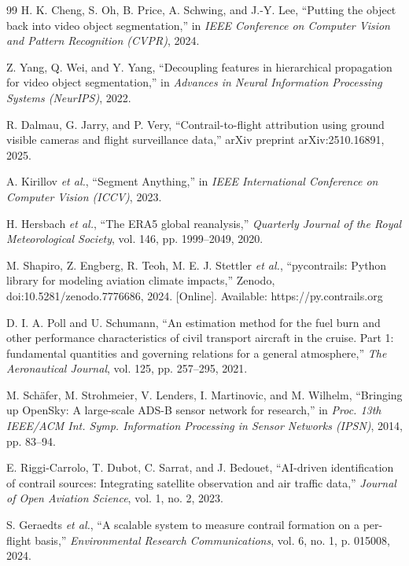 \documentclass[1p,11pt]{elsarticle}
\begin{document}
\begin{thebibliography}{99}
H. K. Cheng, S. Oh, B. Price, A. Schwing, and J.-Y. Lee, ``Putting the object back into video object segmentation,'' in \textit{IEEE Conference on Computer Vision and Pattern Recognition (CVPR)}, 2024.

Z. Yang, Q. Wei, and Y. Yang, ``Decoupling features in hierarchical propagation for video object segmentation,'' in \textit{Advances in Neural Information Processing Systems (NeurIPS)}, 2022.

R. Dalmau, G. Jarry, and P. Very, ``Contrail-to-flight attribution using ground visible cameras and flight surveillance data,'' arXiv preprint arXiv:2510.16891, 2025.

A. Kirillov \textit{et al.}, ``Segment Anything,'' in \textit{IEEE International Conference on Computer Vision (ICCV)}, 2023.

H. Hersbach \textit{et al.}, ``The ERA5 global reanalysis,'' \textit{Quarterly Journal of the Royal Meteorological Society}, vol. 146, pp. 1999--2049, 2020.

M. Shapiro, Z. Engberg, R. Teoh, M. E. J. Stettler \textit{et al.}, ``pycontrails: Python library for modeling aviation climate impacts,'' Zenodo, doi:10.5281/zenodo.7776686, 2024. [Online]. Available: https://py.contrails.org

D. I. A. Poll and U. Schumann, ``An estimation method for the fuel burn and other performance characteristics of civil transport aircraft in the cruise. Part 1: fundamental quantities and governing relations for a general atmosphere,'' \textit{The Aeronautical Journal}, vol. 125, pp. 257--295, 2021.

M. Sch\"{a}fer, M. Strohmeier, V. Lenders, I. Martinovic, and M. Wilhelm, ``Bringing up OpenSky: A large-scale ADS-B sensor network for research,'' in \textit{Proc. 13th IEEE/ACM Int. Symp. Information Processing in Sensor Networks (IPSN)}, 2014, pp. 83--94.

E. Riggi-Carrolo, T. Dubot, C. Sarrat, and J. Bedouet, ``AI-driven identification of contrail sources: Integrating satellite observation and air traffic data,'' \textit{Journal of Open Aviation Science}, vol. 1, no. 2, 2023.

S. Geraedts \textit{et al.}, ``A scalable system to measure contrail formation on a per-flight basis,'' \textit{Environmental Research Communications}, vol. 6, no. 1, p. 015008, 2024.


\end{thebibliography}
\end{document}
